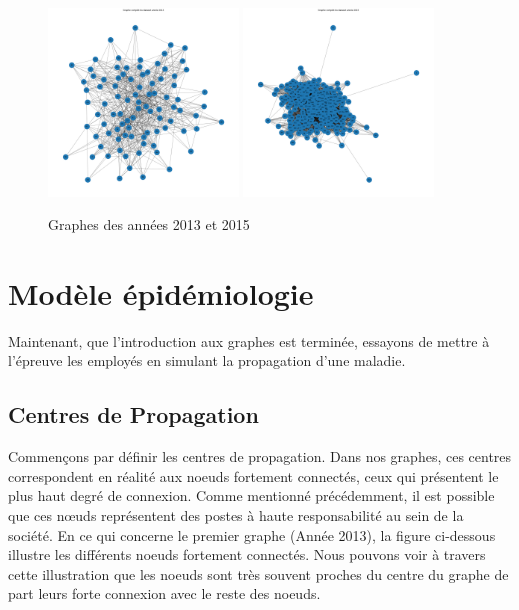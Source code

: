 \documentclass{article}
\begin{document}
\begin{figure}[!h]
    \centering
    \includegraphics[width=0.45\textwidth]{assets/proprietebase/2013}
    \hfill
    \includegraphics[width=0.45\textwidth]{assets/proprietebase/2015}
    \caption{Graphes des années 2013 et 2015}
    \label{fig:2013-2015}
\end{figure}

\section{Modèle épidémiologie}

Maintenant, que l'introduction aux graphes est terminée, essayons de mettre à l'épreuve les employés en simulant la propagation d'une maladie.

\subsection{Centres de Propagation}

Commençons par définir les centres de propagation. Dans nos graphes, ces centres correspondent en réalité aux noeuds fortement connectés, ceux qui présentent le plus haut degré de connexion. Comme mentionné précédemment, il est possible que ces nœuds représentent des postes à haute responsabilité au sein de la société. En ce qui concerne le premier graphe (Année 2013), la figure ci-dessous illustre les différents noeuds fortement connectés. Nous pouvons voir à travers cette illustration que les noeuds sont très souvent proches du centre du graphe de part leurs forte connexion avec le reste des noeuds.
\end{document}
